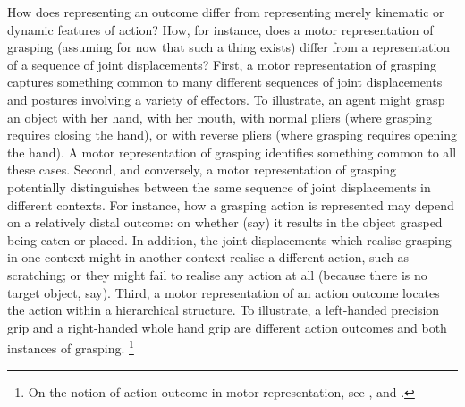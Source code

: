 \documentclass[12pt,\papersize]{extarticle}
\begin{document}
How does representing an outcome differ from representing merely kinematic or dynamic features of action? 
How, for instance, does a motor representation of grasping (assuming for now that such a thing exists) differ from a representation of a sequence of joint displacements? 
First, a motor representation of grasping captures something common to many different sequences of joint displacements and postures involving a variety of effectors. 
To illustrate, an agent might grasp an object with her hand, with her mouth, with normal pliers (where grasping requires closing the hand), or with reverse pliers (where grasping requires opening the hand). 
A motor representation of grasping identifies something common to all these cases. 
Second, and conversely, a motor representation of grasping potentially distinguishes between the same sequence of joint displacements in different contexts. 
For instance, how a grasping action is represented may depend on a relatively distal outcome: on whether (say) it results in the object grasped being eaten or placed. In addition, the joint displacements which realise grasping in one context might in another context realise a different action, such as scratching; or they might fail to realise any action at all (because there is no target object, say). Third, a motor representation of an action outcome locates the action within a hierarchical structure. To illustrate, a left-handed precision grip and a right-handed whole hand grip are different action outcomes and both instances of grasping.%
\footnote{On the notion of action outcome in motor representation, see \citet{gallese:2000_inner}, \citet{jeannerod_motor_2006} and \citet{rizzolatti_mirrors_2008}.}  
\end{document}
